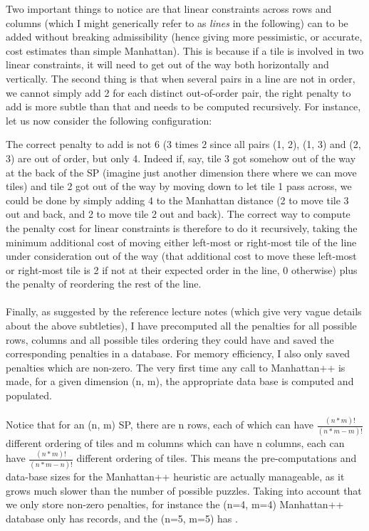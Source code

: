 \begin{itemize}
Two important things to notice are that linear constraints across rows and columns (which I might generically refer to as \textit{lines} in the following) can to be added without breaking admissibility (hence giving more pessimistic, or accurate, cost estimates than simple Manhattan). This is because if a tile is involved in two linear constraints, it will need to get out of the way both horizontally and vertically. The second thing is that when several pairs in a line are not in order, we cannot simply add 2 for each distinct out-of-order pair, the right penalty to add is more subtle than that and needs to be computed recursively. For instance, let us now consider the following configuration:
\begin{center}
\begin{five}
\end{five}
\end{center}
The correct penalty to add is not 6 (3 times 2 since all pairs (1, 2), (1, 3) and (2, 3) are out of order, but only 4. Indeed if, say, tile 3 got somehow out of the way at the back of the SP (imagine just another dimension there where we can move tiles) and tile 2 got out of the way by moving down to let tile 1 pass across, we could be done by simply adding 4 to the Manhattan distance (2 to move tile 3 out and back, and 2 to move tile 2 out and back). The correct way to compute the penalty cost for linear constraints is therefore to do it recursively, taking the minimum additional cost of moving either left-most or right-most tile of the line under consideration out of the way (that additional cost to move these left-most or right-most tile is 2 if not at their expected order in the line, 0 otherwise) plus the penalty of reordering the rest of the line.
\\
\\
Finally, as suggested by the reference lecture notes (which give very vague details about the above subtleties), I have precomputed all the penalties for all possible rows, columns and all possible tiles ordering they could have and saved the corresponding penalties in a database. For memory efficiency, I also only saved penalties which are non-zero. The very first time any call to Manhattan++ is made, for a given dimension (n, m), the appropriate data base is computed and populated.
\\
\\
Notice that for an (n, m) SP, there are n rows, each of which can have $\frac{(n * m)!}{(n * m - m)!}$ different ordering of tiles and m columns which can have n columns, each can have $\frac{(n * m)!}{(n * m - n)!}$ different ordering of tiles. This means the pre-computations and data-base sizes for the Manhattan++ heuristic are actually manageable, as it grows much slower than the number of possible puzzles. Taking into account that we only store non-zero penalties, for instance the (n=4, m=4) Manhattan++ database only has  records, and the (n=5, m=5) has .




\end{itemize}
